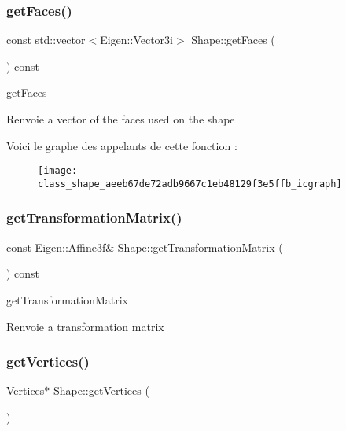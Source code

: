 \subsubsection{\texorpdfstring{get\+Faces()}{getFaces()}}
{\footnotesize\ttfamily const std\+::vector$<$Eigen\+::\+Vector3i$>$ Shape\+::get\+Faces (\begin{DoxyParamCaption}{ }\end{DoxyParamCaption}) const\hspace{0.3cm}{\ttfamily [inline]}}



get\+Faces 

\begin{DoxyReturn}{Renvoie}
a vector of the faces used on the shape 
\end{DoxyReturn}
Voici le graphe des appelants de cette fonction \+:
\nopagebreak
\begin{figure}[H]
\begin{center}
\leavevmode
\texttt{[image: class\_shape\_aeeb67de72adb9667c1eb48129f3e5ffb\_icgraph]}
\end{center}
\end{figure}
\mbox{\label{class_shape_a9a1f2d5c370b8c9194fc51ea37a03cac}} 
\subsubsection{\texorpdfstring{get\+Transformation\+Matrix()}{getTransformationMatrix()}}
{\footnotesize\ttfamily const Eigen\+::\+Affine3f\& Shape\+::get\+Transformation\+Matrix (\begin{DoxyParamCaption}{ }\end{DoxyParamCaption}) const\hspace{0.3cm}{\ttfamily [inline]}}



get\+Transformation\+Matrix 

\begin{DoxyReturn}{Renvoie}
a transformation matrix 
\end{DoxyReturn}
\mbox{\label{class_shape_aacdf84a7934b19a50bf9d5b4cd122caf}} 
\subsubsection{\texorpdfstring{get\+Vertices()}{getVertices()}\hspace{0.1cm}{\footnotesize\ttfamily [1/2]}}
{\footnotesize\ttfamily \hyperlink{struct_shape_1_1_vertices}{Vertices}$\ast$ Shape\+::get\+Vertices (\begin{DoxyParamCaption}{ }\end{DoxyParamCaption})\hspace{0.3cm}{\ttfamily [inline]}}



